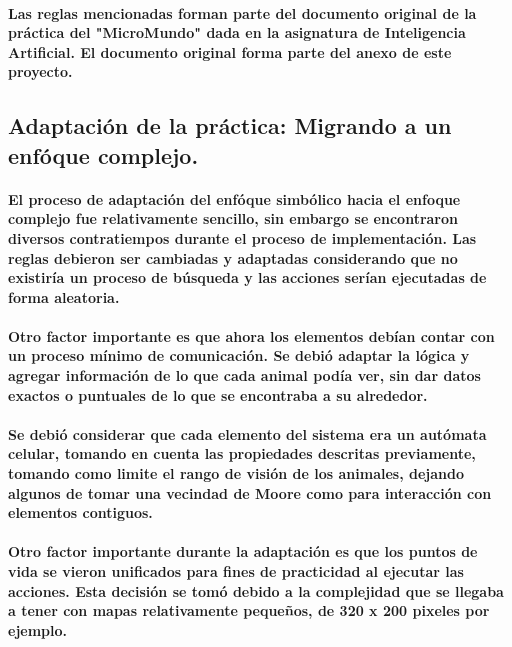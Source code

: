   \paragraph{Las reglas mencionadas forman parte del documento original de la práctica del "MicroMundo" dada en la asignatura de Inteligencia Artificial. El documento original forma parte del anexo de este proyecto.\cite{9}}
\subsection{Adaptación de la práctica: Migrando a un enfóque complejo.}
  \paragraph{El proceso de adaptación del enfóque simbólico hacia el enfoque complejo fue relativamente sencillo, sin embargo se encontraron diversos contratiempos durante el proceso de implementación. Las reglas debieron ser cambiadas y adaptadas considerando que no existiría un proceso de búsqueda y las acciones serían ejecutadas de forma aleatoria.}
  \paragraph{Otro factor importante es que ahora los elementos debían contar con un proceso mínimo de comunicación. Se debió adaptar la lógica y agregar información de lo que cada animal podía ver, sin dar datos exactos o puntuales de lo que se encontraba a su alrededor.}
  \paragraph{Se debió considerar que cada elemento del sistema era un autómata celular, tomando en cuenta las propiedades descritas previamente, tomando como limite el rango de visión de los animales, dejando algunos de tomar una vecindad de Moore como para interacción con elementos contiguos.}
  \paragraph{Otro factor importante durante la adaptación es que los puntos de vida se vieron unificados para fines de practicidad al ejecutar las acciones. Esta decisión se tomó debido a la complejidad que se llegaba a tener con mapas relativamente pequeños, de 320 x 200 pixeles por ejemplo.}
